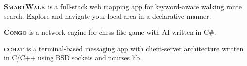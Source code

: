 
\vspace{1.0em}

\textsc{\textbf{SmartWalk}} \textsuperscript{\href{https://zhukovdm.github.io/smartwalk-docs/}{\faExternalLink*}} is a full-stack web mapping app for keyword-aware walking route search. Explore and navigate your local area in a declarative manner.

\vspace{0.7em}

\textsc{\textbf{Congo}} \textsuperscript{\href{https://github.com/zhukovdm/Congo}{\faExternalLink*}} is a network engine for chess-like game with AI written in C\#.

\vspace{0.7em}

\textsc{\textbf{cchat}} \textsuperscript{\href{https://github.com/zhukovdm/cchat}{\faExternalLink*}} is a terminal-based messaging app with client-server architecture written in C/C++ using BSD sockets and \textsf{ncurses} lib.

\vspace{1.0em}
